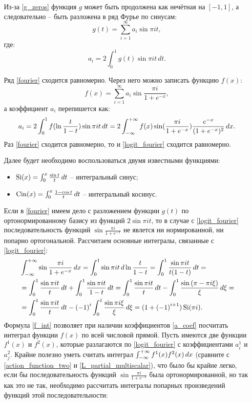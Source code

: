 Из-за \ref{g_zeros} функция $g$ может быть продолжена как нечётная на $[-1, 1]$, а следовательно -- быть разложена в ряд Фурье по синусам:
\begin{equation}
	g(t) = \sum_{i=1}^\infty a_i\sin{\pi it},
	\label{fourier}
\end{equation}
где:
\begin{equation}
	a_i = 2\int_0^1g(t) \sin{\pi it} \, dt.
	\label{a_coef}
\end{equation}

Ряд \ref{fourier} сходится равномерно. Через него можно записать функцию $f(x)$:
\begin{equation}
	f(x) = \sum_{i=1}^\infty a_i\sin{\frac{\pi i}{1 + e^{-x}}},
	\label{logit_fourier}
\end{equation}
а коэффициент $a_i$ перепишется как:
\begin{equation}
	a_i = 2\int_0^1f(\ln\frac{t}{1-t}) \sin{\pi it} \, dt = 2\int_{-\infty}^{+\infty} f(x)\sin(\frac{\pi i}{1+e^{-x}})\frac{e^{-x}}{(1+e^{-x})^2}\, dx.
	\label{a_coef_logit}
\end{equation}
Раз \ref{fourier} сходится равномерно, то и \ref{logit_fourier} сходится равномерно.

Далее будет необходимо воспользоваться двумя известными функциями:
\begin{itemize}
\item $\operatorname{Si}(x) = \int_0^x\frac{\sin t}{t}\, dt$ -- интегральный синус;
\item $\operatorname{Cin}(x) = \int_0^x\frac{1 - \cos t}{t}\, dt$ -- интегральный косинус.
\end{itemize}

Если в \ref{fourier} имеем дело с разложением функции $g(t)$ по ортонормированному базису из функций $2\sin{\pi it}$, то в случае с \ref{logit_fourier}
последовательность функций $\sin{\frac{\pi i}{1 + e^{-x}}}$ не явлется ни нормированной, ни попарно ортогональной. Рассчитаем основные интегралы, связанные с \ref{logit_fourier}:
\begin{align}
	&\int_{-\infty}^{+\infty}\sin{\frac{\pi i}{1+e^{-x}}} \, dx = \int_0^1\sin{\pi it} \, d\ln{\frac{t}{1-t}} = \int_0^1 \frac{\sin{\pi it}}{t(1-t)} \, dt = \notag \\
	&= \int_0^1 \frac{\sin{\pi it}}{t} \, dt + \int_0^1 \frac{\sin{\pi it}}{1-t} \, dt = \int_0^1 \frac{\sin{\pi it}}{t} \, dt - \int_0^1 \frac{\sin{(\pi - \pi i\xi)}}{\xi} \, d\xi = \notag \\
	&= \int_0^1 \frac{\sin{\pi it}}{t} \, dt - {(-1)}^i\int_0^1 \frac{\sin{\pi i\xi}}{\xi} \, d\xi = (1 + {(-1)}^{i+1})\operatorname{Si}(\pi i).
	\label{f_int}
\end{align}
Формула \ref{f_int} позволяет при наличии коэффициентов \ref{a_coef} посчитать интеграл функции $f(x)$ по всей числовой прямой. Пусть имеются две функции $f^1(x)$ и $f^2(x)$, которые разлагаются по \ref{logit_fourier} с коэффициентами $a^1_i$ и $a^2_j$. Крайне полезно уметь считать интеграл $\int_{-\infty}^{+\infty} f^1(x)f^2(x)\, dx$ (сравните с \ref{action_function_two} и \ref{L_partial_multiscalar}), что было бы крайне легко, если бы последовательность функций $\sin{\frac{\pi i}{1 + e^{-x}}}$ была ортонормированной, но так как это не так, необходимо рассчитать интегралы попарных произведений функций этой последовательности:

